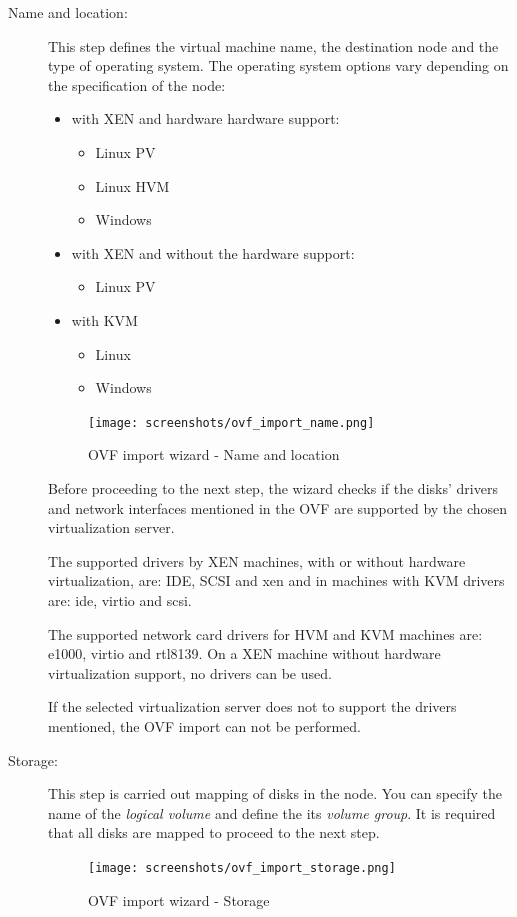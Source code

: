 \begin{description}
    \item[Name and location:] This step defines the virtual machine name, the destination node and the type of operating system. The operating system options vary depending on the specification of the node:
		\begin{itemize}
			\item with XEN and hardware hardware support:
			\begin{itemize}
				\item Linux PV
				\item Linux HVM
				\item Windows
			\end{itemize}
 			\item with XEN and without the hardware support:
			\begin{itemize}
				\item Linux PV
			\end{itemize}
 			\item with KVM
			\begin{itemize}
				\item Linux
				\item Windows
			\end{itemize}
		\end{itemize}

        \begin{figure}[H]
            \begin{center}
            \texttt{[image: screenshots/ovf\_import\_name.png]}
            \caption{OVF import wizard - Name and location}
            \label{fig:ovf_import_name}
            \end{center}
        \end{figure}
        Before proceeding to the next step, the wizard checks if the disks' drivers and network interfaces mentioned in the OVF are supported by the chosen virtualization server.

        The supported drivers by XEN machines, with or without hardware virtualization, are: IDE, SCSI and xen and in machines with KVM drivers are: ide, virtio and scsi.

        The supported network card drivers for HVM and KVM machines are: e1000, virtio and rtl8139. On a XEN machine without hardware virtualization support, no drivers can be used.

        If the selected virtualization server does not to support the drivers mentioned, the OVF import can not be performed.


    \item[Storage:] This step is carried out mapping of disks in the node. You can specify the name of the \emph{logical volume} and define the its \emph{volume group}.
         It is required that all disks are mapped to proceed to the next step.        
		\begin{figure}[H]
            \begin{center}
            \texttt{[image: screenshots/ovf\_import\_storage.png]}
            \caption{OVF import wizard - Storage}
            \label{fig:ovf_import_storage}
            \end{center}
        \end{figure}    


\end{description}
